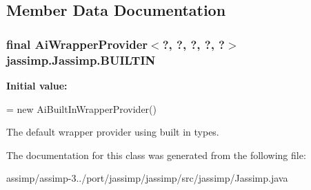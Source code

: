 \subsection{Member Data Documentation}
\hypertarget{classjassimp_1_1_jassimp_a4b5a9a1f13f2397a63d7630d80e5e3a2}{
\subsubsection[{B\+U\+I\+L\+T\+I\+N}]{\setlength{\rightskip}{0pt plus 5cm}final Ai\+Wrapper\+Provider$<$?, ?, ?, ?, ?$>$ jassimp.\+Jassimp.\+B\+U\+I\+L\+T\+I\+N\hspace{0.3cm}{\ttfamily [static]}}}\label{classjassimp_1_1_jassimp_a4b5a9a1f13f2397a63d7630d80e5e3a2}
{\bfseries Initial value\+:}
\begin{DoxyCode}
= 
            \textcolor{keyword}{new} AiBuiltInWrapperProvider()
\end{DoxyCode}
The default wrapper provider using built in types. 

The documentation for this class was generated from the following file\+:\begin{DoxyCompactItemize}
\item 
assimp/assimp-\/3../port/jassimp/jassimp/src/jassimp/Jassimp.\+java\end{DoxyCompactItemize}
